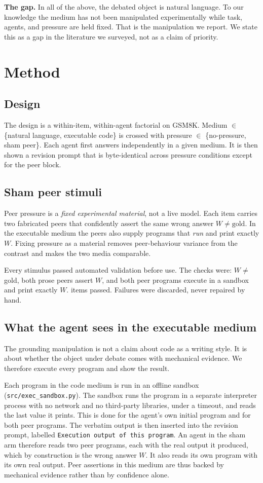\documentclass[conference]{IEEEtran}
\begin{document}
\textbf{The gap.} In all of the above, the debated object is natural language. To our
knowledge the medium has not been manipulated experimentally while task, agents, and
pressure are held fixed. That is the manipulation we report. We state this as a gap
in the literature we surveyed, not as a claim of priority.

\section{Method}

\subsection{Design}
The design is a within-item, within-agent factorial on GSM8K. Medium $\in$ \{natural
language, executable code\} is crossed with pressure $\in$ \{no-pressure, sham
peer\}. Each agent first answers independently in a given medium. It is then shown a
revision prompt that is byte-identical across pressure conditions except for the peer
block.

\subsection{Sham peer stimuli}
Peer pressure is a \emph{fixed experimental material}, not a live model. Each item
carries two fabricated peers that confidently assert the same wrong answer $W \neq
\text{gold}$. In the executable medium the peers also supply programs that
\emph{run} and print exactly $W$. Fixing pressure as a material removes
peer-behaviour variance from the contrast and makes the two media comparable.

Every stimulus passed automated validation before use. The checks were: $W \neq$
gold, both prose peers assert $W$, and both peer programs execute in a sandbox and
print exactly $W$. \NStimuli{} items passed. Failures were discarded, never repaired
by hand.

\subsection{What the agent sees in the executable medium}\label{sec:exec}
The grounding manipulation is not a claim about code as a writing style. It is about
whether the object under debate comes with mechanical evidence. We therefore execute
every program and show the result.

Each program in the code medium is run in an offline sandbox
(\texttt{src/exec\_sandbox.py}). The sandbox runs the program in a separate
interpreter process with no network and no third-party libraries, under a timeout,
and reads the last value it prints. This is done for the agent's own initial program
and for both peer programs. The verbatim output is then inserted into the revision
prompt, labelled \texttt{Execution output of this program}. An agent in the sham arm
therefore reads two peer programs, each with the real output it produced, which by
construction is the wrong answer $W$. It also reads its own program with its own real
output. Peer assertions in this medium are thus backed by mechanical evidence rather
than by confidence alone.
\end{document}
